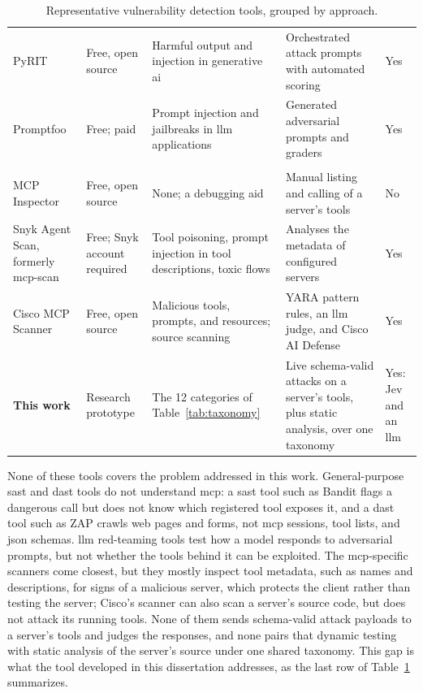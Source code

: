 \begin{table}[htbp]
\begin{tabular}{>{\raggedright\arraybackslash}p{2.5cm} >{\raggedright\arraybackslash}p{1.9cm} >{\raggedright\arraybackslash}p{3.5cm} >{\raggedright\arraybackslash}p{3.6cm} >{\raggedright\arraybackslash}p{2.0cm}}
PyRIT \citep{pyrit} & Free, open source & Harmful output and injection in generative \acrshort{ai} & Orchestrated attack prompts with automated scoring & Yes \\
Promptfoo \citep{promptfoo} & Free; paid & Prompt injection and jailbreaks in \acrshort{llm} applications & Generated adversarial prompts and graders & Yes \\
\hline
\multicolumn{5}{l}{\textit{\acrshort{mcp}-specific}} \\
MCP Inspector \citep{mcpinspector} & Free, open source & None; a debugging aid & Manual listing and calling of a server's tools & No \\
Snyk Agent Scan, formerly mcp-scan \citep{snykagentscan} & Free; Snyk account required & Tool poisoning, prompt injection in tool descriptions, toxic flows & Analyses the metadata of configured servers & Yes \\
Cisco MCP Scanner \citep{ciscomcpscanner} & Free, open source & Malicious tools, prompts, and resources; source scanning & YARA pattern rules, an \acrshort{llm} judge, and Cisco AI Defense & Yes \\
\hline
\textbf{This work} & Research prototype & The 12 categories of Table~\ref{tab:taxonomy} & Live schema-valid attacks on a server's tools, plus static analysis, over one taxonomy & Yes: Jev and an \acrshort{llm} \\
\hline
\end{tabular}
\caption{Representative vulnerability detection tools, grouped by approach.}
\label{tab:existing-tools}
\end{table}

None of these tools covers the problem addressed in this work. General-purpose \gls{sast} and \gls{dast} tools do not understand \gls{mcp}: a \gls{sast} tool such as Bandit flags a dangerous call but does not know which registered tool exposes it, and a \gls{dast} tool such as ZAP crawls web pages and forms, not \gls{mcp} sessions, tool lists, and \gls{json} schemas. \gls{llm} red-teaming tools test how a model responds to adversarial prompts, but not whether the tools behind it can be exploited. The \gls{mcp}-specific scanners come closest, but they mostly inspect tool metadata, such as names and descriptions, for signs of a malicious server, which protects the client rather than testing the server; Cisco's scanner can also scan a server's source code, but does not attack its running tools. None of them sends schema-valid attack payloads to a server's tools and judges the responses, and none pairs that dynamic testing with static analysis of the server's source under one shared taxonomy. This gap is what the tool developed in this dissertation addresses, as the last row of Table~\ref{tab:existing-tools} summarizes.
